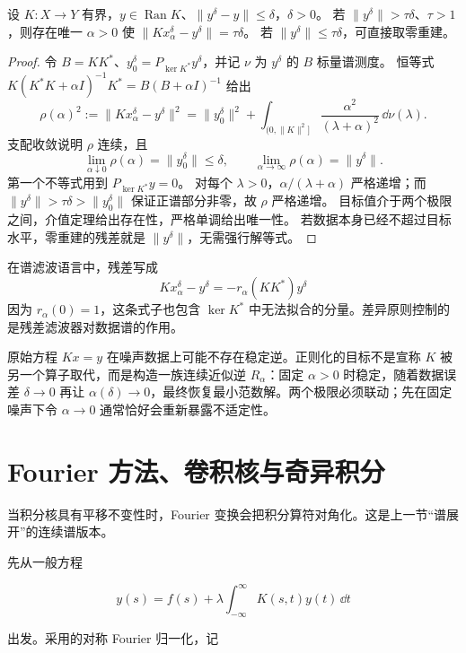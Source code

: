\begin{proposition}
设 $K:X\to Y$ 有界，$y\in\operatorname{Ran}K$、$\|y^\delta-y\|\le\delta$，$\delta>0$。
若 $\|y^\delta\|>\tau\delta$、$\tau>1$，则存在唯一 $\alpha>0$ 使
$\|Kx_\alpha^\delta-y^\delta\|=\tau\delta$。
若 $\|y^\delta\|\le\tau\delta$，可直接取零重建。
\end{proposition}
\begin{proof}
令 $B=KK^*$、$y_0^\delta=P_{\ker K^*}y^\delta$，并记 $\nu$ 为 $y^\delta$ 的 $B$ 标量谱测度。
恒等式 $K(K^*K+\alpha I)^{-1}K^*=B(B+\alpha I)^{-1}$ 给出
\[
\rho(\alpha)^2:=\|Kx_\alpha^\delta-y^\delta\|^2
=\|y_0^\delta\|^2+
\int_{(0,\|K\|^2]}\frac{\alpha^2}{(\lambda+\alpha)^2}\,\dd\nu(\lambda).
\]
支配收敛说明 $\rho$ 连续，且
\[
\lim_{\alpha\downarrow0}\rho(\alpha)=\|y_0^\delta\|\le\delta,
\qquad
\lim_{\alpha\to\infty}\rho(\alpha)=\|y^\delta\|.
\]
第一个不等式用到 $P_{\ker K^*}y=0$。
对每个 $\lambda>0$，$\alpha/(\lambda+\alpha)$ 严格递增；而 $\|y^\delta\|>\tau\delta>\|y_0^\delta\|$ 保证正谱部分非零，故 $\rho$ 严格递增。
目标值介于两个极限之间，介值定理给出存在性，严格单调给出唯一性。
若数据本身已经不超过目标水平，零重建的残差就是 $\|y^\delta\|$，无需强行解等式。
\end{proof}

在谱滤波语言中，残差写成
\[
Kx_\alpha^\delta-y^\delta
=-r_\alpha(KK^*)y^\delta
\]
因为 $r_\alpha(0)=1$，这条式子也包含 $\ker K^*$ 中无法拟合的分量。差异原则控制的是残差滤波器对数据谱的作用。

\begin{note}[正则化不等于人为篡改方程]
原始方程 $Kx=y$ 在噪声数据上可能不存在稳定逆。正则化的目标不是宣称 $K$ 被另一个算子取代，而是构造一族连续近似逆 $R_\alpha$：固定 $\alpha>0$ 时稳定，随着数据误差 $\delta\to0$ 再让 $\alpha(\delta)\to0$，最终恢复最小范数解。两个极限必须联动；先在固定噪声下令 $\alpha\to0$ 通常恰好会重新暴露不适定性。
\end{note}

\section{Fourier 方法、卷积核与奇异积分}
\label{sec:integral-fourier}

当积分核具有平移不变性时，Fourier 变换会把积分算符对角化。这是上一节``谱展开''的连续谱版本。

先从一般方程

\[
y(s)=f(s)+\lambda\int_{-\infty}^{\infty}K(s,t)y(t)\,\dd t
\]

出发。采用的对称 Fourier 归一化，记


